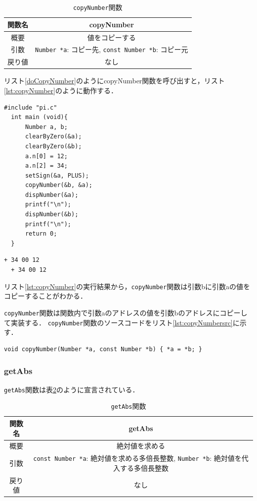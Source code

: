 \documentclass[a4paper,11pt,dvipdfmx]{jsarticle}
\begin{document}
\begin{table}[H]
\centering
\caption{\texttt{copyNumber}関数}
\label{table:lst:copyNumber}
\begin{tabular}{c||c}
\hline
関数名    & copyNumber   \\
\hline
概要    & 値をコピーする   \\
\hline
引数    & \texttt{Number *a}: コピー先, \texttt{const Number *b}: コピー元   \\
\hline
戻り値    & なし   \\
\hline
\end{tabular}
\end{table}

リスト\ref{doCopyNumber}のようにcopyNumber関数を呼び出すと，リスト\ref{lst:copyNumber}のように動作する．
\begin{lstlisting}[caption=copyNumber関数の呼び出し,label=doCopyNumber]
  #include "pi.c"
  int main (void){
      Number a, b;
      clearByZero(&a);
      clearByZero(&b);
      a.n[0] = 12;
      a.n[2] = 34;
      setSign(&a, PLUS);
      copyNumber(&b, &a);
      dispNumber(&a);
      printf("\n");
      dispNumber(&b);
      printf("\n");
      return 0;
  }
\end{lstlisting}

\begin{lstlisting}[caption=リスト\ref{doCopyNumber}の実行結果,label=lst:copyNumber]
  + 34 00 12
  + 34 00 12
\end{lstlisting}

リスト\ref{lst:copyNumber}の実行結果から，\texttt{copyNumber}関数は引数bに引数aの値をコピーすることがわかる．

\texttt{copyNumber}関数は関数内で引数aのアドレスの値を引数bのアドレスにコピーして実装する．
\texttt{copyNumber}関数のソースコードをリスト\ref{lst:copyNumbersrc}に示す．

\begin{lstlisting}[caption=\texttt{copyNumber}関数,label=lst:copyNumbersrc]
  void copyNumber(Number *a, const Number *b) { *a = *b; }
\end{lstlisting}

\subsubsection{getAbs}
\texttt{getAbs}関数は表\ref{table:lst:getAbs}のように宣言されている．

\begin{table}[H]
\centering
\caption{\texttt{getAbs}関数}
\label{table:lst:getAbs}
\begin{tabular}{c||c}
\hline
関数名    & getAbs   \\
\hline
概要    & 絶対値を求める   \\
\hline
引数    & \texttt{const Number *a}: 絶対値を求める多倍長整数, \texttt{Number *b}: 絶対値を代入する多倍長整数   \\
\hline
戻り値    & なし   \\
\hline
\end{tabular}
\end{table}
\end{document}

